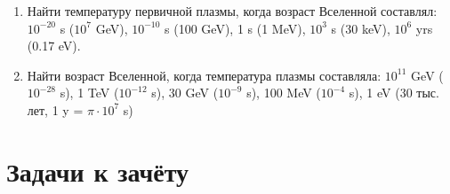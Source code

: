 \documentclass[12pt]{article}
\theoremstyle{definition}
\begin{document}
\begin{enumerate}
    \item Найти температуру первичной плазмы, когда возраст Вселенной составлял: 
    $10^{-20}$ s ($10^7$ GeV), 
    $10^{-10}$ s (100 GeV), 
    1 s (1 MeV),
    $10^{3}$ s (30 keV), 
    $10^6$ yrs (0.17 eV).
    
    \item Найти возраст Вселенной, когда температура плазмы составляла: 
    $10^{11}$ GeV ($10^{-28}$ s),
    1 TeV ($10^{-12}$ s), 
    30 GeV ($10^{-9}$ s), 
    100 MeV ($10^{-4}$ s),
    1 eV (30 тыс. лет, 1 y = $\pi\cdot10^7$ s)
    
\end{enumerate}    


\section{Задачи к зачёту}
\end{document}
